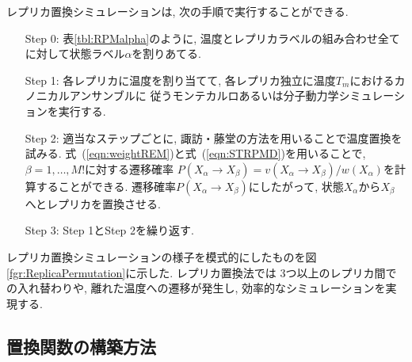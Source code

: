 レプリカ置換シミュレーションは, 次の手順で実行することができる.
\begin{enumerate}
  \setlength{\leftskip}{0.4cm}
 \item[Step 0:]
 	表\ref{tbl:RPMalpha}のように, 温度とレプリカラベルの組み合わせ全てに対して状態ラベル$\alpha$を割りあてる.
 \item[Step 1:]
 	各レプリカに温度を割り当てて, 各レプリカ独立に温度$T_{m}$におけるカノニカルアンサンブルに
	      従うモンテカルロあるいは分子動力学シミュレーションを実行する.

 \item[Step 2:]
 	適当なステップごとに, 諏訪・藤堂の方法を用いることで温度置換を試みる.
	式~(\ref{eqn:weightREM})と式~(\ref{eqn:STRPMD})を用いることで,
	$\beta = 1,\dots,M!$に対する遷移確率
	$P(X_{\alpha} \to X_{\beta}) = v(X_{\alpha} \to X_{\beta})/w(X_{\alpha})$を計算することができる.
	遷移確率$P(X_{\alpha} \to X_{\beta})$にしたがって, 状態$X_{\alpha}$から$X_{\beta}$へとレプリカを置換させる.

 \item[Step 3:]
 	Step 1とStep 2を繰り返す.
\end{enumerate}
レプリカ置換シミュレーションの様子を模式的にしたものを図\ref{fgr:ReplicaPermutation}に示した.
レプリカ置換法では 3つ以上のレプリカ間での入れ替わりや, 離れた温度への遷移が発生し, 効率的なシミュレーションを実現する.


\subsection{置換関数の構築方法}

